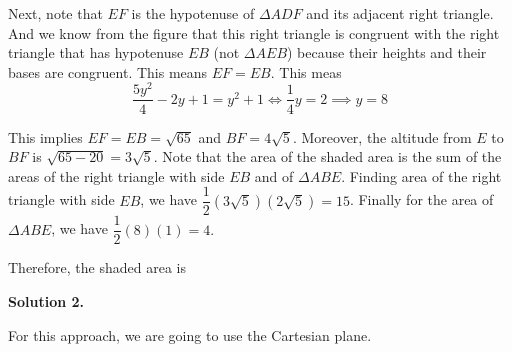 \documentclass[11pt,paper=letter]{scrartcl}
\newcommand{\soln}[1]{{\sffamily \bfseries Solution #1.}\;}
\begin{document}
\begin{center}
\end{center}

Next, note that $EF$ is the hypotenuse of $\Delta ADF$ and its adjacent right triangle. And we know from the figure that this right triangle is congruent with the right triangle that has hypotenuse $EB$ (not $\Delta AEB$) because their heights and their bases are congruent. This means $EF = EB.$ This meas $$\dfrac{5y^2}{4} -2y + 1 = y^2 + 1 \Leftrightarrow \dfrac{1}{4}y = 2 \implies y=8$$

This implies $EF=EB=\sqrt{65}$ and $BF = 4\sqrt{5}$. Moreover, the altitude from $E$ to $BF$ is $\sqrt{65-20} = 3\sqrt{5}$. Note that the area of the shaded area is the sum of the areas of the right triangle with side $EB$ and of $\Delta ABE$. Finding area of the right triangle with side $EB$, we have $\dfrac{1}{2}(3\sqrt{5})(2\sqrt{5}) = 15$. Finally for the area of $\Delta ABE$, we have $\dfrac{1}{2}(8)(1) = 4.$

Therefore, the shaded area is 

\soln2

For this approach, we are going to use the Cartesian plane. 
\end{document}
